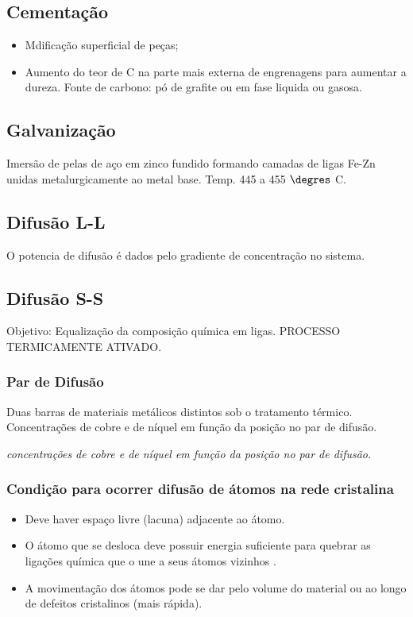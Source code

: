 \subsection{Cementação}

\begin{itemize}
	\item Mdificação superficial de peças;
	\item Aumento do teor de C na parte mais externa de engrenagens para aumentar a dureza. Fonte de carbono: pó de grafite ou em fase liquida ou gasosa.
\end{itemize}


\subsection{Galvanização}

Imersão de pelas de aço em zinco fundido formando camadas de ligas Fe-Zn unidas metalurgicamente ao metal base. Temp. 445 a 455 $\degres$ C.

\subsection{Difusão L-L}
O potencia de difusão é dados pelo gradiente de concentração no sistema.


\subsection{Difusão S-S}

Objetivo: Equalização da composição química em ligas. PROCESSO TERMICAMENTE ATIVADO.

\subsubsection{Par de Difusão}

Duas barras de materiais metálicos  distintos sob o tratamento térmico. Concentrações de cobre e de níquel em função da posição no par de difusão. 

\textit{concentrações de cobre e de níquel em função da posição no par de difusão.}


\subsubsection{Condição para ocorrer difusão de átomos na rede cristalina}

\begin{itemize}
	\item Deve haver espaço livre (lacuna) adjacente ao átomo.
	\item O átomo que se desloca deve possuir energia suficiente para quebrar as ligações química que o une a seus átomos vizinhos .
	\item A movimentação dos átomos pode se dar pelo volume do material ou ao longo de defeitos cristalinos (mais rápida).
\end{itemize}


